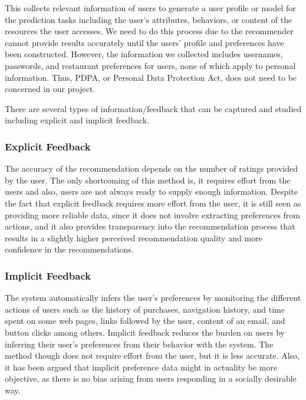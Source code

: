 \documentclass[12pt,oneside,openright,a4paper]{cpe-english-project}
\begin{document}
This collects relevant information of users to generate a user profile or model for the prediction tasks including the user’s attributes, behaviors, or content of the resources the user accesses. \cite{WhatisMachineLearning} We need to do this process due to the recommender cannot provide results accurately until the users’ profile and preferences have been constructed. However, the information we collected includes usernames, passwords, and restaurant preferences for users, none of which apply to personal information. Thus, PDPA, or Personal Data Protection Act, does not need to be concerned in our project. 

There are several types of information/feedback that can be captured and studied including explicit and implicit feedback.

\subsubsection{Explicit Feedback}

The accuracy of the recommendation depends on the number of ratings provided by the user. The only shortcoming of this method is, it requires effort from the users and also, users are not always ready to supply enough information. Despite the fact that explicit feedback requires more effort from the user, it is still seen as providing more reliable data, since it does not involve extracting preferences from actions, and it also provides transparency into the recommendation process that results in a slightly higher perceived recommendation quality and more confidence in the recommendations. \cite{Recommendersystem}

\subsubsection{Implicit Feedback}

The system automatically infers the user’s preferences by monitoring the different actions of users such as the history of purchases, navigation history, and time spent on some web pages, links followed by the user, content of an email, and button clicks among others. Implicit feedback reduces the burden on users by inferring their user’s preferences from their behavior with the system. The method though does not require effort from the user, but it is less accurate. Also, it has been argued that implicit preference data might in actuality be more objective, as there is no bias arising from users responding in a socially desirable way. \cite{Recommendersystem}
\end{document}
